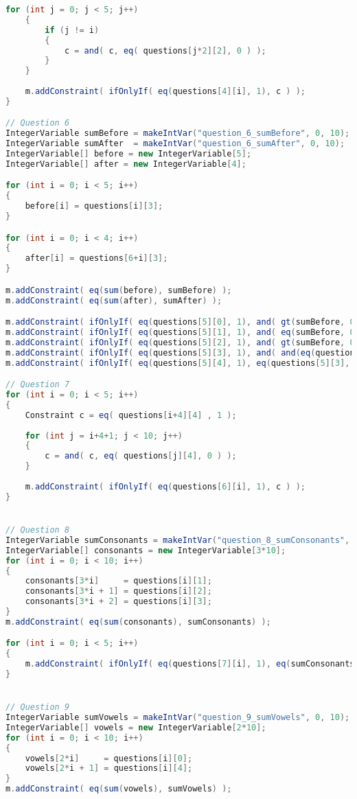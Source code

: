 \begin{lstlisting}[language=Java]
	for (int j = 0; j < 5; j++)
	{
		if (j != i)
		{
			c = and( c, eq( questions[j*2][2], 0 ) );
		}
	}
	
	m.addConstraint( ifOnlyIf( eq(questions[4][i], 1), c ) );
}

// Question 6
IntegerVariable sumBefore = makeIntVar("question_6_sumBefore", 0, 10);
IntegerVariable sumAfter  = makeIntVar("question_6_sumAfter", 0, 10);
IntegerVariable[] before = new IntegerVariable[5];
IntegerVariable[] after = new IntegerVariable[4];

for (int i = 0; i < 5; i++)
{
	before[i] = questions[i][3];
}

for (int i = 0; i < 4; i++)
{
	after[i] = questions[6+i][3];
}

m.addConstraint( eq(sum(before), sumBefore) );
m.addConstraint( eq(sum(after), sumAfter) );

m.addConstraint( ifOnlyIf( eq(questions[5][0], 1), and( gt(sumBefore, 0), eq(sumAfter, 0) )) );
m.addConstraint( ifOnlyIf( eq(questions[5][1], 1), and( eq(sumBefore, 0), gt(sumAfter, 0) )) );
m.addConstraint( ifOnlyIf( eq(questions[5][2], 1), and( gt(sumBefore, 0), gt(sumAfter, 0) )) );
m.addConstraint( ifOnlyIf( eq(questions[5][3], 1), and( and(eq(questions[5][3], 0), eq(sumBefore, 0)), eq(sumAfter, 0) )) );
m.addConstraint( ifOnlyIf( eq(questions[5][4], 1), eq(questions[5][3], 1)) );

// Question 7
for (int i = 0; i < 5; i++)
{
	Constraint c = eq( questions[i+4][4] , 1 );
	
	for (int j = i+4+1; j < 10; j++)
	{
		c = and( c, eq( questions[j][4], 0 ) );
	}
	
	m.addConstraint( ifOnlyIf( eq(questions[6][i], 1), c ) );
}


// Question 8
IntegerVariable sumConsonants = makeIntVar("question_8_sumConsonants", 0, 10);
IntegerVariable[] consonants = new IntegerVariable[3*10];
for (int i = 0; i < 10; i++)
{
	consonants[3*i]     = questions[i][1];
	consonants[3*i + 1] = questions[i][2];
	consonants[3*i + 2] = questions[i][3];
}
m.addConstraint( eq(sum(consonants), sumConsonants) );

for (int i = 0; i < 5; i++)
{
	m.addConstraint( ifOnlyIf( eq(questions[7][i], 1), eq(sumConsonants, 7 - i) ) );
}


// Question 9
IntegerVariable sumVowels = makeIntVar("question_9_sumVowels", 0, 10);
IntegerVariable[] vowels = new IntegerVariable[2*10];
for (int i = 0; i < 10; i++)
{
	vowels[2*i]     = questions[i][0];
	vowels[2*i + 1] = questions[i][4];
}
m.addConstraint( eq(sum(vowels), sumVowels) );


\end{lstlisting}
